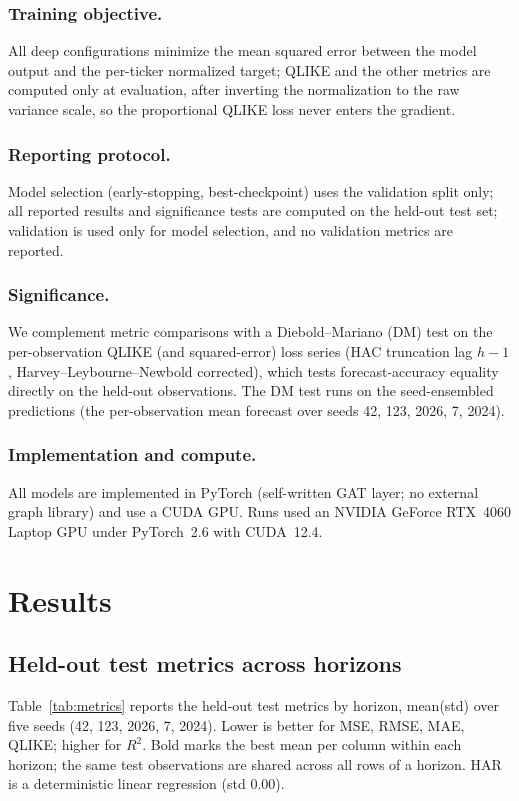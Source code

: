 \documentclass[runningheads]{llncs}
\begin{document}
\subsubsection{Training objective.}
All deep configurations minimize the mean squared error between the model output and the per-ticker
normalized target; QLIKE and the other metrics are computed only at evaluation, after inverting the
normalization to the raw variance scale, so the proportional QLIKE loss never enters the gradient.

\subsubsection{Reporting protocol.}
Model selection (early-stopping, best-checkpoint) uses the validation split only; all reported results and
significance tests are computed on the held-out test set; validation is used only for model selection, and
no validation metrics are reported.

\subsubsection{Significance.}
We complement metric comparisons with a Diebold--Mariano (DM) test on the per-observation QLIKE (and
squared-error) loss series (HAC truncation lag $h{-}1$, Harvey--Leybourne--Newbold corrected), which tests
forecast-accuracy equality directly on the held-out observations. The DM test runs on the seed-ensembled
predictions (the per-observation mean forecast over seeds 42, 123, 2026, 7, 2024).

\subsubsection{Implementation and compute.}
All models are implemented in PyTorch (self-written GAT layer; no external graph library) and use a CUDA
GPU. Runs used an NVIDIA GeForce RTX~4060 Laptop GPU under PyTorch~2.6 with CUDA~12.4.

\section{Results}
\label{sec:results}

\subsection{Held-out test metrics across horizons}
\label{sec:results-metrics}
Table~\ref{tab:metrics} reports the held-out test metrics by horizon, mean(std) over five seeds
(42, 123, 2026, 7, 2024). Lower is better for MSE, RMSE, MAE, QLIKE; higher for $R^2$. Bold marks the best
mean per column within each horizon; the same test observations are shared across all rows of a horizon.
HAR is a deterministic linear regression (std $0.00$).
\end{document}
